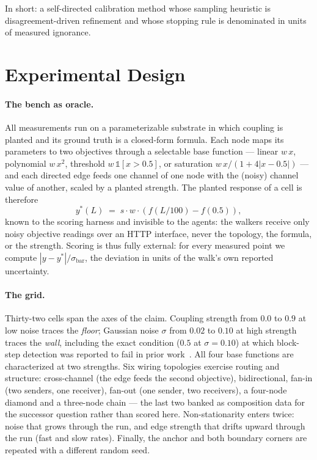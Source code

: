 \documentclass[11pt,a4paper]{article}
\begin{document}
In short: a self-directed calibration method whose sampling
heuristic is disagreement-driven refinement and whose stopping rule
is denominated in units of measured ignorance.

\section{Experimental Design}
\label{sec:design}

\paragraph{The bench as oracle.}
All measurements run on a parameterizable substrate in which coupling
is planted and its ground truth is a closed-form formula. Each node
maps its parameters to two objectives through a selectable base
function --- linear $w\,x$, polynomial $w\,x^2$, threshold
$w\,\mathbb{1}[x>0.5]$, or saturation $w\,x/(1+4|x-0.5|)$ --- and each
directed edge feeds one channel of one node with the (noisy) channel
value of another, scaled by a planted strength. The planted response
of a cell is therefore
\begin{equation}
y^*(L) \;=\; s \cdot w \cdot \left( f(L/100) - f(0.5) \right),
\label{eq:truth}
\end{equation}
known to the scoring harness and invisible to the agents: the walkers
receive only noisy objective readings over an HTTP interface, never
the topology, the formula, or the strength. Scoring is thus fully
external: for every measured point we compute
$|y - y^*|/\sigma_{\text{bar}}$, the deviation in units of the
walk's own reported uncertainty.

\paragraph{The grid.}
Thirty-two cells span the axes of the claim. Coupling strength from
$0.0$ to $0.9$ at low noise traces the \emph{floor}; Gaussian noise
$\sigma$ from $0.02$ to $0.10$ at high strength traces the
\emph{wall}, including the exact condition ($0.5$ at $\sigma{=}0.10$)
at which block-step detection was reported to fail in prior
work~\cite{p1}. All four base functions are characterized at two
strengths. Six wiring topologies exercise routing and structure:
cross-channel (the edge feeds the second objective), bidirectional,
fan-in (two senders, one receiver), fan-out (one sender, two
receivers), a four-node diamond and a three-node chain --- the last
two banked as composition data for the successor question rather than
scored here. Non-stationarity enters twice: noise that grows through
the run, and edge strength that drifts upward through the run
(fast and slow rates). Finally, the anchor and both boundary corners
are repeated with a different random seed.
\end{document}
